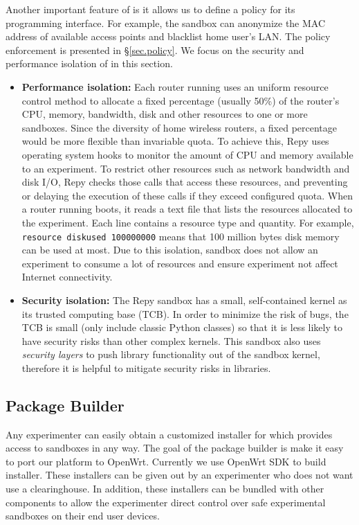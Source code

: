 Another important feature of \sandboxname is it allows us to define a policy for its programming interface. For example, the sandbox can anonymize the MAC address of available access points and blacklist home user's LAN. The policy enforcement is presented in \S{\ref{sec.policy}}. We focus on the security and performance isolation of \sandboxname in this section.
\begin{itemize}
\item \textbf{Performance isolation: }Each router running \sysname uses an uniform resource control method to allocate a fixed percentage (usually 50\%) of the router's CPU, memory, bandwidth, disk and other resources to one or more sandboxes. Since the diversity of home wireless routers,  a fixed percentage would be more flexible than invariable quota. To achieve this, Repy uses operating system hooks to monitor the amount of CPU and memory available to an experiment. To restrict other resources such as network bandwidth and disk I/O, Repy checks those calls that access these resources, and preventing or delaying the execution of these calls if they exceed configured quota. When a router running \sysname boots, it reads a text file that lists the resources allocated to the experiment. Each line contains a resource type and quantity. For example, \texttt{resource diskused 100000000} means that 100 million bytes disk memory can be used at most. Due to this isolation, sandbox does not allow an experiment to consume a lot of resources and ensure experiment not affect Internet connectivity.

\item \textbf{Security isolation: }The Repy sandbox has a small, self-contained kernel as its trusted computing base (TCB). In order to minimize the risk of bugs, the TCB is small (only include classic Python classes) so that it is less likely to have security risks than other complex kernels. This sandbox also uses \textit{security layers} to push library functionality out of the sandbox kernel, therefore it is helpful to mitigate security risks in libraries. 

\end{itemize}
\subsection{Package Builder}
\label{sec.packagebuilder}
Any experimenter can easily obtain a customized installer for \sysname which provides access to sandboxes in any way. The goal of the package builder is make it easy to port our platform to OpenWrt. Currently we use OpenWrt SDK to build installer. These installers can be given out by an experimenter who does not want use a clearinghouse. In addition, these installers can be bundled with other components to allow the experimenter direct control over safe experimental sandboxes on their end user devices.

